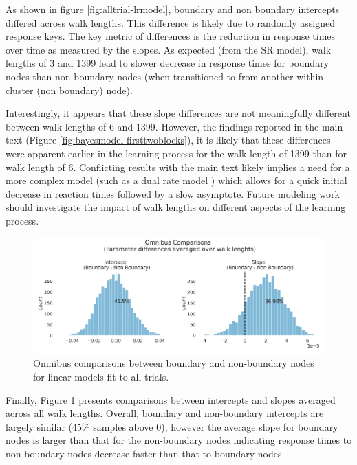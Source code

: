 As shown in figure \ref{fig:alltrial-lrmodel}, boundary and non boundary intercepts differed across walk lengths. This difference is likely due to randomly assigned response keys. The key metric of differences is the reduction in response times over time as measured by the slopes. As expected (from the SR model), walk lengths of 3 and 1399 lead to slower decrease in response times for boundary nodes than non boundary nodes (when transitioned to from another within cluster (non boundary) node). 

Interestingly, it appears that these slope differences are not meaningfully different between walk lengths of 6 and 1399. However, the findings reported in the main text (Figure \ref{fig:bayesmodel-firsttwoblocks}), it is likely that these differences were apparent earlier in the learning process for the walk length of 1399 than for walk length of 6. Conflicting results with the main text likely implies a need for a more complex model (such as a dual rate model \parencite{mcdougle2015explicit, smith2006interacting, savalia2022leap}) which allows for a quick initial decrease in reaction times followed by a slow asymptote. Future modeling work should investigate the impact of walk lengths on different aspects of the learning process. 
 

\begin{figure}[H]
    \centering
    \includegraphics[width = \textwidth]{chapter_notebooks/chapter_2/figures/omnibus_comparisons_trialmodel.png}
    \caption{Omnibus comparisons between boundary and non-boundary nodes for linear models fit to all trials.}
    \label{fig:omnibus-alltrial-lrmodel}    
\end{figure}

Finally, Figure \ref{fig:omnibus-alltrial-lrmodel} presents comparisons between intercepts and slopes averaged across all walk lengths. Overall, boundary and non-boundary intercepts are largely similar (45\% samples above 0), however the average slope for boundary nodes is larger than that for the non-boundary nodes indicating response times to non-boundary nodes decrease faster than that to boundary nodes. 

